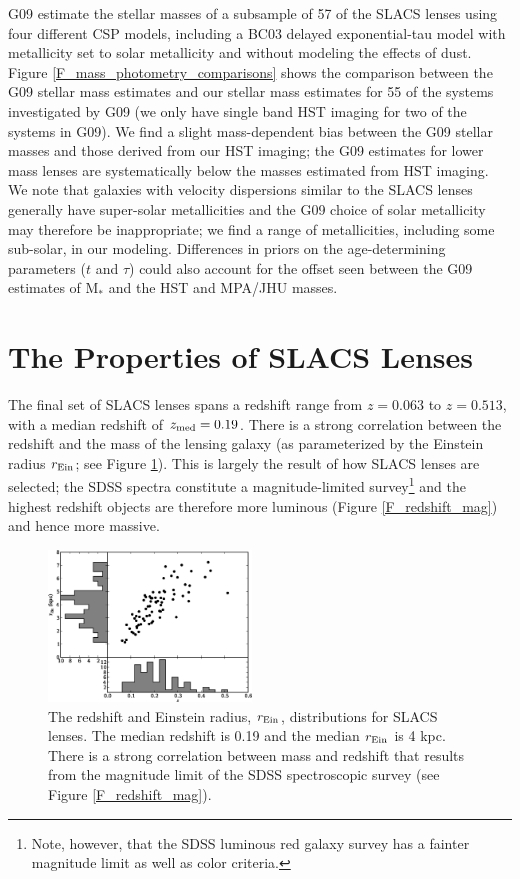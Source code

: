 \documentclass[iop]{emulateapj}
\begin{document}
G09 estimate the stellar masses of a subsample of 57 of the SLACS lenses using four different CSP models, including a BC03 delayed exponential-tau model with metallicity set to solar metallicity and without modeling the effects of dust. Figure \ref{F_mass_photometry_comparisons} shows the comparison between the G09 stellar mass estimates and our stellar mass estimates for 55 of the systems investigated by G09 (we only have single band HST imaging for two of the systems in G09). We find a slight mass-dependent bias between the G09 stellar masses and those derived from our HST imaging; the G09 estimates for lower mass lenses are systematically below the masses estimated from HST imaging. We note that galaxies with velocity dispersions similar to the SLACS lenses generally have super-solar metallicities \citep[e.g.,][]{gallazzi} and the G09 choice of solar metallicity may therefore be inappropriate; we find a range of metallicities, including some sub-solar, in our modeling. Differences in priors on the age-determining parameters ($t$ and $\tau$) could also account for the offset seen between the G09 estimates of M$_*$ and the HST and MPA/JHU masses.


\section{The Properties of SLACS Lenses}
The final set of SLACS lenses spans a redshift range from $z = 0.063$ to $z = 0.513$, with a median redshift of $z_{\rm med} = 0.19$. There is a strong correlation between the redshift and the mass of the lensing galaxy (as parameterized by the Einstein radius $r_{\rm Ein}$; see Figure \ref{F_redshift_rein}). This is largely the result of how SLACS lenses are selected; the SDSS spectra constitute a magnitude-limited survey\footnote{Note, however, that the SDSS luminous red galaxy survey has a fainter magnitude limit as well as color criteria.} and the highest redshift objects are therefore more luminous (Figure \ref{F_redshift_mag}) and hence more massive.

\begin{figure}[ht]
 \centering
 \includegraphics[width=0.48\textwidth,clip]{f7.eps}
 \caption{The redshift and Einstein radius, $r_{\rm Ein}$, distributions for SLACS lenses. The median redshift is 0.19 and the median $r_{\rm Ein}$ is 4 kpc. There is a strong correlation between mass and redshift that results from the magnitude limit of the SDSS spectroscopic survey (see Figure \ref{F_redshift_mag}).}
 \label{F_redshift_rein}
\end{figure}
\end{document}
